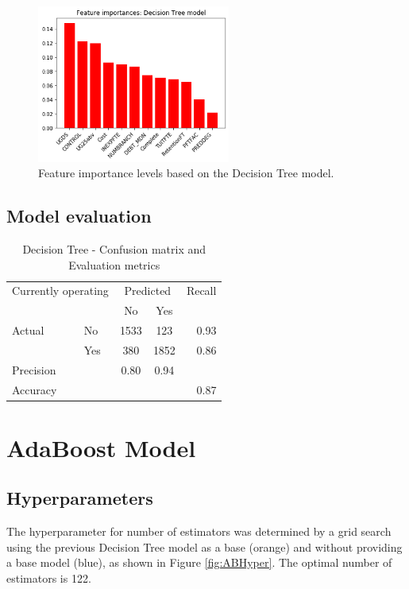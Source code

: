 \documentclass[11pt, letterpaper]{article}
\begin{document}
\begin{figure}[h]
\begin{center}
\includegraphics[width=2.5in]{DTFeatureImportance.png}
\caption{Feature importance levels based on the Decision Tree model.} 
\label{fig:DTFeatures}
\end{center}
\end{figure}

\subsection{Model evaluation}

\begin{table}[h]
\begin{center}
\caption{Decision Tree - Confusion matrix and Evaluation metrics}
\begin{tabular}{l l | c c r }
\multicolumn{2}{l}{Currently operating} & \multicolumn{2}{c}{Predicted} & Recall \\
& & No & Yes &  \\ 
\cline{2-5}
Actual & No & 1533 &  123 & 0.93 \\
& Yes & 380 & 1852 & 0.86 \\  \hline
Precision&  & 0.80 & 0.94 \\ 
Accuracy & & &  & 0.87 \\
\end{tabular}
\label{tab:DTConfusion}
\end{center}
\end{table} 

\section{AdaBoost Model}

\subsection{Hyperparameters}
The hyperparameter for number of estimators was determined by a grid search using the previous Decision Tree model as a base (orange) and without providing a base model (blue), as shown in Figure \ref{fig:ABHyper}. The optimal number of estimators is 122.
\end{document}
